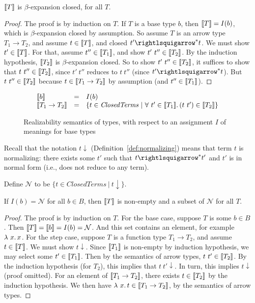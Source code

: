 \begin{lemma}
\label{lem:betaexpclosed}
  $\llbracket T \rrbracket$ is $\beta$-expansion closed,
  for all $T$.
\end{lemma}
\begin{proof}
  The proof is by induction on $T$.  If $T$ is a base type $b$, then
  $\llbracket T \rrbracket = I(b)$, which is $\beta$-expansion closed by
  assumption.  So assume $T$ is an arrow type $T_1 \to T_2$, and
  assume $t\in\llbracket T \rrbracket$, and closed $t'\betaa^* t$.  We must show
  $t'\in\llbracket T \rrbracket$.  For that, assume $t''\in\llbracket T_1 \rrbracket$, and show
  $t'\ t''\in\interp{T_2}$.  By the induction hypothesis, $\llbracket T_2 \rrbracket$
  is $\beta$-expansion closed.  So to show $t'\ t''\in\interp{T_2}$,
  it suffices to show that $t\ t''\in\llbracket T_2 \rrbracket$, since $t'\ t''$
  reduces to $t\ t''$ (since $t'\betaa^* t$).  But $t\ t''\in\llbracket T_2 \rrbracket$
  because $t\in\llbracket T_1\to T_2 \rrbracket$ by assumption (and $t''\in\llbracket T_1 \rrbracket$).
  \end{proof}

\begin{figure}
\[
\begin{array}{lll}
\interp{b} & = & I(b) \\
\interp{T_1\to T_2} & = & \{ t\in\textit{ClosedTerms}\ |\ \all{t' \in \interp{T_1}}{(t\ t') \in\interp{T_2}} \}
\end{array}
\]
\caption{Realizability semantics of types, with respect to an assignment $I$ of meanings for base types}
\label{fig:stlcrealize}
\end{figure}

Recall that the notation $t \downarrow$
(Definition~\ref{def:normalizing}) means that term $t$ is normalizing:
there exists some $t'$ such that $t\betaa^* t'$ and $t'$ is in normal
form (i.e., does not reduce to any term).

\begin{definition}
\label{def:normterms}
  Define $\mathcal{N}$ to be $\{t \in \textit{ClosedTerms}\ |\ t \downarrow\}$.
\end{definition}

\begin{lemma}
\label{lem:norminterp}
  If $I(b) = \mathcal{N}$ for all $b\in B$, then $\llbracket T \rrbracket$ is non-empty and a subset of $\mathcal{N}$ for
  all $T$.
\end{lemma}
\begin{proof}
  The proof is by induction on $T$.  For the base case, suppose $T$ is
  some $b\in B$.  Then $\llbracket T \rrbracket = \llbracket b \rrbracket = I(b) = \mathcal{N}$.
  And this set contains an element, for example $\lambda\ x.\, x$.  For the
  step case, suppose $T$ is a function type $T_1 \to T_2$, and assume
  $t\in\llbracket T \rrbracket$.  We must show $t\downarrow$.  Since $\llbracket T_1 \rrbracket$ is
  non-empty by induction hypothesis, we may select some $t'\in\llbracket T_1 \rrbracket$.
  Then by the semantics of arrow types, $t\ t'\in\llbracket T_2 \rrbracket$.  By the induction
  hypothesis (for $T_2$), this implies that $t\ t'\downarrow$.  In turn, this
  implies $t\downarrow$ (proof omitted). %
  For an element of $\llbracket T_1\to T_2 \rrbracket$, there exists $t\in\llbracket T_2 \rrbracket$ by
  the induction hypothesis.  We then have $\lambda\ x.\, t\in\llbracket T_1\to T_2 \rrbracket$,
  by the semantics of arrow types. 
\end{proof}   

